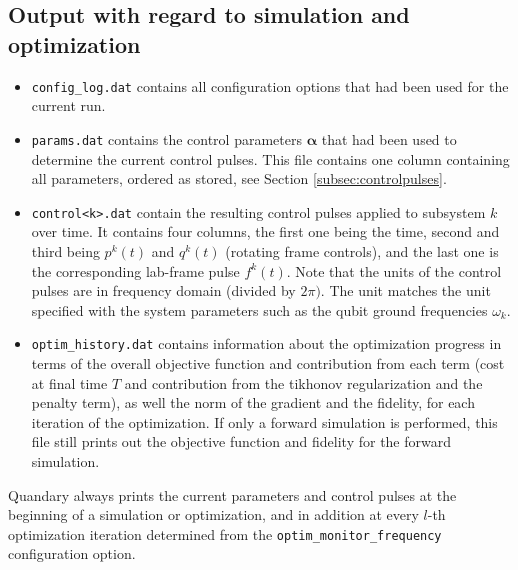 \documentclass[11pt]{article}
\newcommand{\bfa}{\boldsymbol{\alpha}}
\begin{document}
\subsection{Output with regard to simulation and optimization}
\begin{itemize}
  \item \texttt{config\_log.dat} contains all configuration options that had been used for the current run. 
  \item \texttt{params.dat} contains the control parameters $\bfa$ that had been used to determine the current control pulses. This file contains one column containing all parameters, ordered as stored, see Section \ref{subsec:controlpulses}.
  \item \texttt{control<k>.dat} contain the resulting control pulses applied to subsystem $k$ over time. It contains four columns, the first one being the time, second and third being $p^k(t)$ and $q^k(t)$ (rotating frame controls), and the last one is the corresponding lab-frame pulse $f^k(t)$. Note that the units of the control pulses are in frequency domain (divided by $2\pi)$. The unit matches the unit specified with the system parameters such as the qubit ground frequencies $\omega_k$.
  \item \texttt{optim\_history.dat} contains information about the optimization progress in terms of the overall objective function and contribution from each term (cost at final time $T$ and contribution from the tikhonov regularization and the penalty term), as well the norm of the gradient and the fidelity, for each iteration of the optimization. If only a forward simulation is performed, this file still prints out the objective function and fidelity for the forward simulation. 
\end{itemize}
Quandary always prints the current parameters and control pulses at the beginning of a simulation or optimization, and in addition at every $l$-th optimization iteration determined from the \texttt{optim\_monitor\_frequency} configuration option. 
\end{document}
